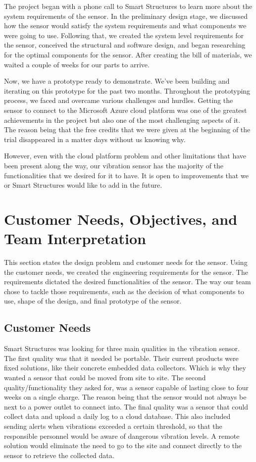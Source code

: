 \documentclass[11pt]{article}
\begin{document}
The project began with a phone call to Smart Structures to learn more about the system requirements of the sensor. In the preliminary design stage, we discussed how the sensor would satisfy the system requirements and what components we were going to use. Following that, we created the system level requirements for the sensor, conceived the structural and software design, and began researching for the optimal components for the sensor. After creating the bill of materials, we waited a couple of weeks for our parts to arrive.

Now, we have a prototype ready to demonstrate. We've been building and iterating on this prototype for the past two months. Throughout the prototyping process, we faced and overcame various challenges and hurdles. Getting the sensor to connect to the Microsoft Azure cloud platform was one of the greatest achievements in the project but also one of the most challenging aspects of it. The reason being that the free credits that we were given at the beginning of the trial disappeared in a matter days without us knowing why.

However, even with the cloud platform problem and other limitations that have been present along the way, our vibration sensor has the majority of the functionalities that we desired for it to have. It is open to improvements that we or Smart Structures would like to add in the future.

\section{Customer Needs, Objectives, and Team Interpretation}

This section states the design problem and customer needs for the sensor. Using the customer needs, we created the engineering requirements for the sensor. The requirements dictated the desired functionalities of the sensor. The way our team chose to tackle those requirements, such as the decision of what components to use, shape of the design,  and final prototype of the sensor.

\subsection{Customer Needs}

Smart Structures was looking for three main qualities in the vibration sensor. The first quality was that it needed be portable. Their current products were fixed solutions, like their concrete embedded data collectors. Which is why they wanted a sensor that could be moved from site to site. The second quality/functionality they asked for, was a sensor capable of lasting close to four weeks on a single charge. The reason being that the sensor would not always be next to a power outlet to connect into. The final quality was a sensor that could collect data and upload a daily log to a cloud database. This also included sending alerts when vibrations exceeded a certain threshold, so that the responsible personnel would be aware of dangerous vibration levels. A remote solution would eliminate the need to go to the site and connect directly to the sensor to retrieve the collected data.
	
\end{document}
